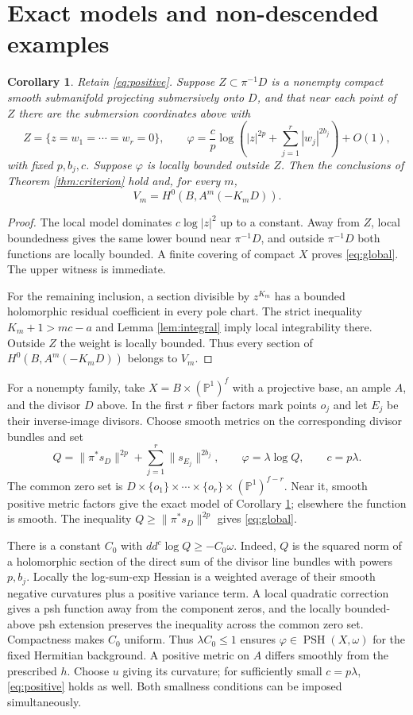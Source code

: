 \documentclass[11pt]{article}
\newtheorem{corollary}{Corollary}
\newcommand{\ddc}{dd^c}
\newcommand{\PSH}{\operatorname{PSH}}
\newcommand{\PP}{\mathbb P}
\begin{document}
\section{Exact models and non-descended examples}
\begin{corollary}\label{cor:exact}
Retain \eqref{eq:positive}. Suppose $Z\subset\pi^{-1}D$ is a nonempty
compact smooth submanifold projecting submersively onto $D$, and that near
each point of $Z$ there are the submersion coordinates above with
\[
 Z=\{z=w_1=\cdots=w_r=0\},\qquad
 \varphi=\frac cp\log\left(|z|^{2p}+\sum_{j=1}^r|w_j|^{2b_j}\right)+O(1),
\]
with fixed $p,b_j,c$. Suppose $\varphi$ is locally bounded outside $Z$.
Then the conclusions of Theorem \ref{thm:criterion} hold and, for every $m$,
\[
 V_m=H^0(B,A^m(-K_mD)).
\]
\end{corollary}
\begin{proof}
The local model dominates $c\log|z|^2$ up to a constant. Away from $Z$,
local boundedness gives the same lower bound near $\pi^{-1}D$, and outside
$\pi^{-1}D$ both functions are locally bounded. A finite covering of
compact $X$ proves \eqref{eq:global}. The upper witness is immediate.

For the remaining inclusion, a section divisible by $z^{K_m}$ has a bounded
holomorphic residual coefficient in every pole chart. The strict inequality
$K_m+1>mc-a$ and Lemma \ref{lem:integral} imply local integrability there.
Outside $Z$ the weight is locally bounded. Thus every section of
$H^0(B,A^m(-K_mD))$ belongs to $V_m$.
\end{proof}

For a nonempty family, take $X=B\times(\PP^1)^f$ with a projective base,
an ample $A$, and the divisor $D$ above. In the first $r$ fiber factors mark
points $o_j$ and let $E_j$ be their inverse-image divisors. Choose smooth
metrics on the corresponding divisor bundles and set
\[
 Q=\|\pi^*s_D\|^{2p}+\sum_{j=1}^r\|s_{E_j}\|^{2b_j},\qquad
 \varphi=\lambda\log Q,\qquad c=p\lambda.
\]
The common zero set is
$D\times\{o_1\}\times\cdots\times\{o_r\}\times(\PP^1)^{f-r}$.
Near it, smooth positive metric factors give the exact model of
Corollary \ref{cor:exact}; elsewhere the function is smooth.
The inequality $Q\geq\|\pi^*s_D\|^{2p}$ gives \eqref{eq:global}.

There is a constant $C_0$ with $\ddc\log Q\geq-C_0\omega$. Indeed, $Q$
is the squared norm of a holomorphic section of the direct sum of the
divisor line bundles with powers $p,b_j$. Locally the log-sum-exp Hessian
is a weighted average of their smooth negative curvatures plus a positive
variance term. A local quadratic correction gives a psh function away from
the component zeros, and the locally bounded-above psh extension preserves
the inequality across the common zero set. Compactness makes $C_0$ uniform.
Thus $\lambda C_0\leq1$ ensures $\varphi\in\PSH(X,\omega)$ for the
fixed Hermitian background. A positive metric on $A$ differs smoothly from
the prescribed $h$. Choose $u$ giving its curvature; for sufficiently small
$c=p\lambda$, \eqref{eq:positive} holds as well. Both smallness conditions
can be imposed simultaneously.
\end{document}
